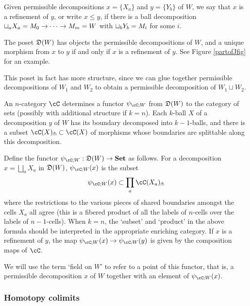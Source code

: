 \documentclass{pnastwo}
\begin{document}
\begin{article}
Given permissible decompositions $x = \{X_a\}$ and $y = \{Y_b\}$ of $W$, we say that $x$ is a refinement
of $y$, or write $x \le y$, if there is a ball decomposition $\sqcup_a X_a = M_0\to\cdots\to M_m = W$
with $\sqcup_b Y_b = M_i$ for some $i$.

\begin{defn}
The poset $\mathfrak{D}(W)$ has objects the permissible decompositions of $W$, 
and a unique morphism from $x$ to $y$ if and only if $x$ is a refinement of $y$.
See Figure \ref{partofJfig} for an example.
\end{defn}

This poset in fact has more structure, since we can glue together permissible decompositions of $W_1$ and $W_2$ to obtain a permissible decomposition of $W_1 \sqcup W_2$. 

An $n$-category $\cC$ determines 
a functor $\psi_{\cC;W}$ from $\mathfrak{D}(W)$ to the category of sets 
(possibly with additional structure if $k=n$).
Each $k$-ball $X$ of a decomposition $y$ of $W$ has its boundary decomposed into $k{-}1$-balls,
and there is a subset $\cC(X)\spl \sub \cC(X)$ of morphisms whose boundaries
are splittable along this decomposition.

\begin{defn}
Define the functor $\psi_{\cC;W} : \cell(W) \to \Set$ as follows.
For a decomposition $x = \bigsqcup_a X_a$ in $\mathfrak{D}(W)$, $\psi_{\cC;W}(x)$ is the subset
\begin{equation*}
	\psi_{\cC;W}(x) \sub \prod_a \cC(X_a)\spl
\end{equation*}
where the restrictions to the various pieces of shared boundaries amongst the cells
$X_a$ all agree (this is a fibered product of all the labels of $n$-cells over the labels of $n-1$-cells). When $k=n$, the `subset' and `product' in the above formula should be interpreted in the appropriate enriching category.
If $x$ is a refinement of $y$, the map $\psi_{\cC;W}(x) \to \psi_{\cC;W}(y)$ is given by the composition maps of $\cC$.
\end{defn}

We will use the term `field on $W$' to refer to a point of this functor,
that is, a permissible decomposition $x$ of $W$ together with an element of $\psi_{\cC;W}(x)$.


\subsubsection{Homotopy colimits}


\end{article}
\end{document}
